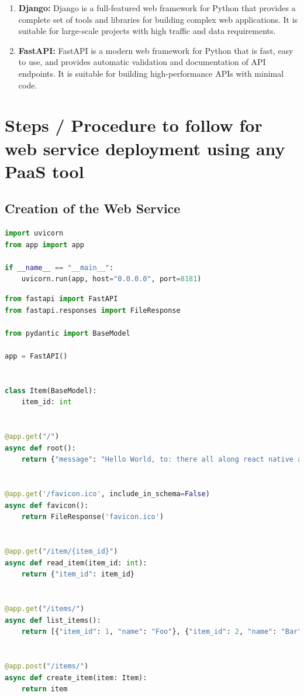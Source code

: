 \documentclass[11pt]{article}
\begin{document}
\begin{enumerate}
\begin{enumerate}
              \item \textbf{Django:} Django is a full-featured web framework for Python that provides a complete set of tools and libraries for building complex web applications. It is suitable for large-scale projects with high traffic and data requirements.
              \item \textbf{FastAPI:} FastAPI is a modern web framework for Python that is fast, easy to use, and provides automatic validation and documentation of API endpoints. It is suitable for building high-performance APIs with minimal code.
          \end{enumerate}
\end{enumerate}

\section{Steps / Procedure to follow for web service deployment using any PaaS tool}

\subsection{Creation of the Web Service}

\begin{lstlisting}[language=python]
import uvicorn
from app import app

if __name__ == "__main__":
    uvicorn.run(app, host="0.0.0.0", port=8181)
\end{lstlisting}


\begin{lstlisting}[language=python]
from fastapi import FastAPI
from fastapi.responses import FileResponse

from pydantic import BaseModel

app = FastAPI()


class Item(BaseModel):
    item_id: int


@app.get("/")
async def root():
    return {"message": "Hello World, to: there all along react native app."}


@app.get('/favicon.ico', include_in_schema=False)
async def favicon():
    return FileResponse('favicon.ico')


@app.get("/item/{item_id}")
async def read_item(item_id: int):
    return {"item_id": item_id}


@app.get("/items/")
async def list_items():
    return [{"item_id": 1, "name": "Foo"}, {"item_id": 2, "name": "Bar"}]


@app.post("/items/")
async def create_item(item: Item):
    return item
\end{lstlisting}
\end{document}
